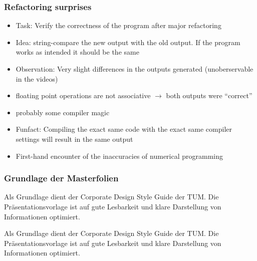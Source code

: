 \begin{frame}
    \frametitle{Refactoring surprises}
		\large
		\begin{itemize}
			\item<1-> Task: Verify the correctness of the program after major refactoring
			\item<2-> Idea: string-compare the new output with the old output. If the program works as intended it should be the same
			\item<3-> Observation: Very slight differences in the outputs generated (unoberservable in the videos)
		\end{itemize}
		\begin{itemize}
			\item<5-> floating point operations are not associative $\rightarrow$ both outputs were "`correct"'
			\item<6-> probably some compiler magic
			\item<7-> Funfact: Compiling the exact same code with the exact same compiler settings will result in the same output
			\item<8-> First-hand encounter of the inaccuracies of numerical programming
		\end{itemize}

\end{frame}
\clearpage



\begin{frame}
    \frametitle{Grundlage der Masterfolien}

Als Grundlage dient der Corporate Design Style Guide der TUM.\newline
Die Präsentationsvorlage ist auf gute Lesbarkeit und klare Darstellung von
Informationen optimiert.

\end{frame}
\clearpage



\begin{frame}

Als Grundlage dient der Corporate Design Style Guide der TUM.\newline
Die Präsentationsvorlage ist auf gute Lesbarkeit und klare Darstellung von
Informationen optimiert.

\end{frame}
\clearpage


